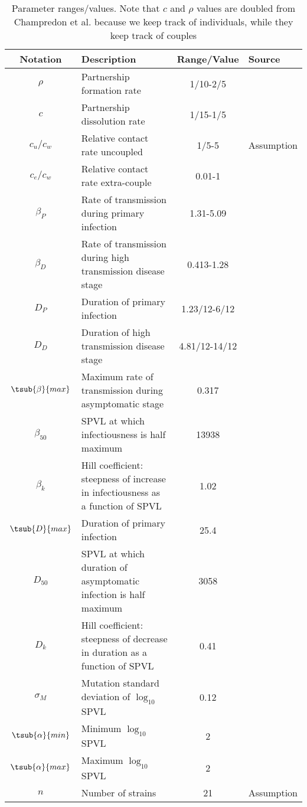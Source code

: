 
\begin{table}[ht]
\caption{Parameter ranges/values.  Note that $c$ and $\rho$ values are doubled from Champredon et al. because we keep track of individuals, while they keep track of couples}
\centering
\begin{tabular}{c p{2in} c l}
\hline 
Notation & Description & Range/Value & Source\\
\hline %
$\rho$ & Partnership formation rate & 1/10-2/5 & \cite{champredon_hiv_2013} \\
$c$ & Partnership dissolution rate & 1/15-1/5 & \cite{champredon_hiv_2013} \\
$c_u/c_w$ & Relative contact rate uncoupled & 1/5-5 & Assumption \\
$c_e/c_w$ & Relative contact rate extra-couple & 0.01-1 & \cite{champredon_hiv_2013} \\
$\beta_P$ & Rate of transmission during primary infection & 1.31-5.09 & \cite{hollingsworth_hiv1_2008} \\
$\beta_D$ & Rate of transmission during high transmission disease stage & 0.413-1.28 & \cite{hollingsworth_hiv1_2008} \\
$D_P$ & Duration of primary infection & 1.23/12-6/12 & \cite{hollingsworth_hiv1_2008} \\
$D_D$ & Duration of high transmission disease stage & 4.81/12-14/12 & \cite{hollingsworth_hiv1_2008} \\
$\tsub{\beta}{max}$ & Maximum rate of transmission during asymptomatic stage & 0.317 & \cite{shirreff_transmission_2011} \\
$\beta_{50}$ & SPVL at which infectiousness is half maximum & 13938 & \cite{shirreff_transmission_2011} \\
$\beta_k$ & Hill coefficient: steepness of increase in infectiousness as a function of SPVL & 1.02 & \cite{shirreff_transmission_2011} \\
$\tsub{D}{max}$ & Duration of primary infection & 25.4 & \cite{shirreff_transmission_2011} \\
$D_{50}$ & SPVL at which duration of asymptomatic infection is half maximum & 3058 & \cite{shirreff_transmission_2011} \\
$D_{k}$ & Hill coefficient: steepness of decrease in duration as a function of SPVL & 0.41 & \cite{shirreff_transmission_2011} \\
$\sigma_M$ & Mutation standard deviation of $\log_{10}$ SPVL & 0.12 & \cite{shirreff_transmission_2011} \\
$\tsub{\alpha}{min}$ & Minimum $\log_{10}$ SPVL & 2 & \cite{shirreff_transmission_2011}\\
$\tsub{\alpha}{max}$ & Maximum $\log_{10}$ SPVL & 2 & \cite{shirreff_transmission_2011}\\
$n$ & Number of strains & 21 & Assumption\\
\hline
\end{tabular}
\label{table:parmsTable}
\end{table}



